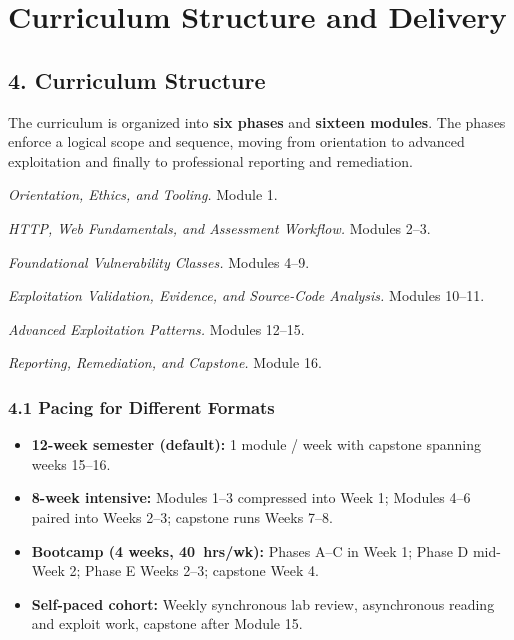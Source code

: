 \documentclass[11pt,letterpaper,oneside]{report}
\begin{document}
\chapter*{Curriculum Structure and Delivery}

\section*{4. Curriculum Structure}
The curriculum is organized into \textbf{six phases} and \textbf{sixteen modules}. The phases enforce a logical scope and sequence, moving from orientation to advanced exploitation and finally to professional reporting and remediation.

\begin{tcolorbox}[callout,colback=afpaper,colframe=afnavy,colbacktitle=afnavy,title=Phase Map]
\begin{description}[leftmargin=2.4cm,style=nextline]
  \item[Phase A] \textit{Orientation, Ethics, and Tooling.} Module 1.
  \item[Phase B] \textit{HTTP, Web Fundamentals, and Assessment Workflow.} Modules 2--3.
  \item[Phase C] \textit{Foundational Vulnerability Classes.} Modules 4--9.
  \item[Phase D] \textit{Exploitation Validation, Evidence, and Source-Code Analysis.} Modules 10--11.
  \item[Phase E] \textit{Advanced Exploitation Patterns.} Modules 12--15.
  \item[Phase F] \textit{Reporting, Remediation, and Capstone.} Module 16.
\end{description}
\end{tcolorbox}

\subsection*{4.1 Pacing for Different Formats}
\begin{itemize}
  \item \textbf{12-week semester (default):} 1 module / week with capstone spanning weeks 15--16.
  \item \textbf{8-week intensive:} Modules 1--3 compressed into Week 1; Modules 4--6 paired into Weeks 2--3; capstone runs Weeks 7--8.
  \item \textbf{Bootcamp (4 weeks, 40~hrs/wk):} Phases A--C in Week 1; Phase D mid-Week 2; Phase E Weeks 2--3; capstone Week 4.
  \item \textbf{Self-paced cohort:} Weekly synchronous lab review, asynchronous reading and exploit work, capstone after Module 15.
\end{itemize}
\end{document}
